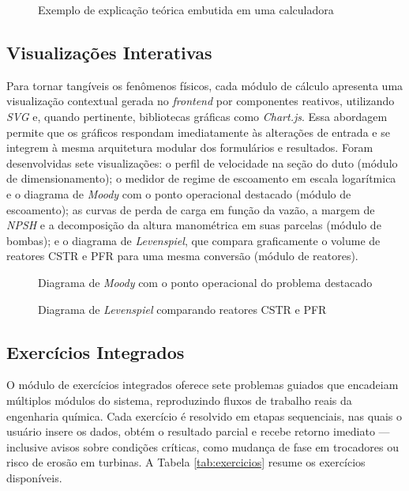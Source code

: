 \begin{figure}[H]
    \centering
    \caption{Exemplo de explicação teórica embutida em uma calculadora}
    \label{fig:explicacao_teorica}
\end{figure}

\subsection{Visualizações Interativas}

Para tornar tangíveis os fenômenos físicos, cada módulo de cálculo apresenta uma visualização contextual gerada no \textit{frontend} por componentes reativos, utilizando \textit{SVG} e, quando pertinente, bibliotecas gráficas como \textit{Chart.js}. Essa abordagem permite que os gráficos respondam imediatamente às alterações de entrada e se integrem à mesma arquitetura modular dos formulários e resultados. Foram desenvolvidas sete visualizações: o perfil de velocidade na seção do duto (módulo de dimensionamento); o medidor de regime de escoamento em escala logarítmica e o diagrama de \textit{Moody} com o ponto operacional destacado (módulo de escoamento); as curvas de perda de carga em função da vazão, a margem de \textit{NPSH} e a decomposição da altura manométrica em suas parcelas (módulo de bombas); e o diagrama de \textit{Levenspiel}, que compara graficamente o volume de reatores CSTR e PFR para uma mesma conversão (módulo de reatores).

\begin{figure}[H]
    \centering
    \caption{Diagrama de \textit{Moody} com o ponto operacional do problema destacado}
    \label{fig:viz_moody}
\end{figure}

\begin{figure}[H]
    \centering
    \caption{Diagrama de \textit{Levenspiel} comparando reatores CSTR e PFR}
    \label{fig:viz_levenspiel}
\end{figure}

\subsection{Exercícios Integrados}

O módulo de exercícios integrados oferece sete problemas guiados que encadeiam múltiplos módulos do sistema, reproduzindo fluxos de trabalho reais da engenharia química. Cada exercício é resolvido em etapas sequenciais, nas quais o usuário insere os dados, obtém o resultado parcial e recebe retorno imediato --- inclusive avisos sobre condições críticas, como mudança de fase em trocadores ou risco de erosão em turbinas. A Tabela \ref{tab:exercicios} resume os exercícios disponíveis.

